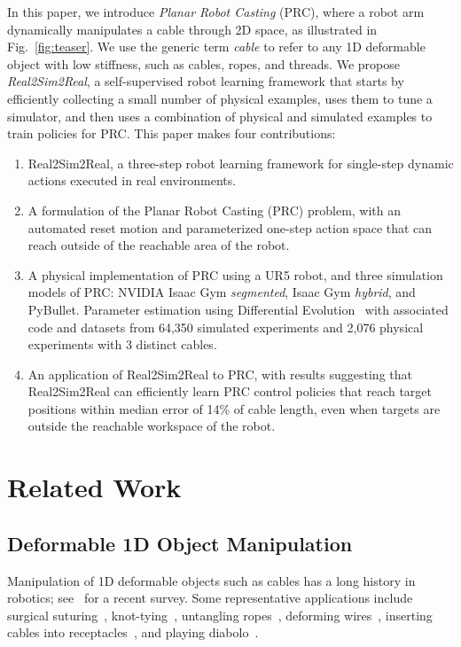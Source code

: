 \documentclass[letterpaper, 10pt, conference]{ieeeconf}  %
\begin{document}
In this paper, we introduce \emph{Planar Robot Casting} (PRC), where a robot arm dynamically manipulates a cable through 2D space, as illustrated in Fig.~\ref{fig:teaser}. We use the generic term \emph{cable} to refer to any 1D deformable object with low stiffness, such as cables, ropes, and threads. We propose {\em Real2Sim2Real}, a self-supervised robot learning framework that starts by efficiently collecting a small number of physical examples, uses them to tune a simulator, and then uses a combination of physical and simulated examples to train policies for PRC. This paper makes four contributions:

\begin{enumerate}
    \item Real2Sim2Real, a three-step robot learning framework for single-step dynamic actions executed in real environments.
    \item A formulation of the Planar Robot Casting (PRC) problem, with an automated reset motion and parameterized one-step action space that can reach outside of the reachable area of the robot. 
    \item  A physical implementation of PRC using a UR5 robot, and three simulation models of PRC: NVIDIA Isaac Gym \emph{segmented}, Isaac Gym \emph{hybrid}, and PyBullet. Parameter estimation using Differential Evolution~\cite{storn1997differential,2020SciPy-NMeth} with associated code and datasets from 64,350 simulated experiments and 2,076 physical experiments with 3 distinct cables.
    \item An application of Real2Sim2Real to PRC, with results suggesting that Real2Sim2Real can efficiently learn PRC control policies that reach target positions within median error of 14\% of cable length, even when targets are outside the reachable workspace of the robot.
\end{enumerate}

\section{Related Work}\label{sec:rw}

\subsection{Deformable 1D Object Manipulation}

Manipulation of 1D deformable objects such as cables has a long history in robotics; see~\citet{manip_deformable_survey_2018} for a recent survey. Some representative applications include surgical suturing~\cite{robot_heart_surgery_2006,suturing_autolab_2016}, knot-tying~\cite{van_den_berg_2010,case_study_knots_1991,knot_planning_2003,tying_precisely_2016}, untangling ropes~\cite{rope_untangling_2013,grannen2020untangling}, deforming wires~\cite{wire_insertion_1997}, inserting cables into receptacles~\cite{tight_tolerance_insertion_2015,tactile_cable_2020}, and playing diabolo~\cite{diabolo_2020}.  
\end{document}
